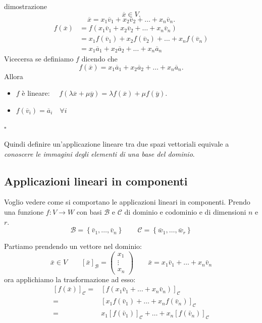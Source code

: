 \documentclass[x11names]{article}
\newcommand*{\QEDB}{\null\nobreak\hfill\ensuremath{\square}}%
\begin{document}
\begin{es}{dimostrazione}
\[
\overline{x} \in V
.\] 
\[
\overline{x} = x_1 \overline{v}_{1} + x_2\overline{v}_{2} + \dots + x_{n}\overline{v}_{n}
.\] 
\begin{align*}
	f\left(\overline{x}\right) &= f\left(x_1 \overline{v}_{1} + x_2\overline{v}_{2} + \dots + x_{n}\overline{v}_{n}\right) \\
				   &= x_1 f\left(\overline{v}_{1}\right) + x_2 f\left(\overline{v}_{2}\right) + \dots + x_{n}f\left(\overline{v}_{n}\right) \\
				   &= x_1 \overline{a}_{1} + x_2 \overline{a}_{2} + \dots + x_{n} \overline{a}_{n}
\end{align*}
Vicecersa se definiamo $f$ dicendo che 
\[
f\left(\overline{x}\right) = x_1 \overline{a}_{1} + x_2 \overline{a}_{2} + \dots + x_{n} \overline{a}_{n}
.\] 
Allora
\begin{itemize}
	\item $f$ è lineare: $\quad f\left(\lambda \overline{x} + \mu \overline{y}\right) = \lambda f\left(\overline{x}\right) + \mu f\left(\overline{y}\right)$.
	\item $f\left(\overline{v}_{i}\right) = \overline{a}_{i} \quad \forall i$
\end{itemize} \QEDB
\end{es}


Quindi definire un'applicazione lineare tra due spazi vettoriali equivale a \textit{conoscere le immagini degli elementi di una base del dominio}.

\subsection{Applicazioni lineari in componenti}
Voglio vedere come si comportano le applicazioni lineari in componenti. Prendo una funzione $f: V \to W$ con basi $\mathcal{B}$ e $\mathcal{C}$ di dominio e codominio e di dimensioni $n$ e $r$. 
\[
\mathcal{B} = \left\{\bar{v}_{1}, \dots, \bar{v}_{n}\right\} \qquad \mathcal{C} = \left\{\bar{w}_{1},\dots,\bar{w}_{r}\right\}
\]

\noindent
Partiamo prendendo un vettore nel dominio:
\[
\bar{x} \in V \qquad \left[\bar{x}\right]_{\mathcal{B}} = \left(\begin{array}{c}
	x_{1} \\
	\vdots \\
	x_{n}
\end{array}\right) \qquad \bar{x} = x_{1}\bar{v}_{1} + \dots + x_{n}\bar{v}_{n}
\]
ora applichiamo la trasformazione ad esso:
\begin{align*}
	\left[f(\bar{x})\right]_{\mathcal{C}} =& \left[f(x_{1}\bar{v}_{1} + \dots + x_{n}\bar{v}_{n})\right]_{\mathcal{C}}	\\
							=& \left[x_{1}f(\bar{v}_{1}) + \dots + x_{n}f(\bar{v}_{n})\right]_{\mathcal{C}} \\
							=& x_{1}\left[f(\bar{v}_{1})\right]_{\mathcal{C}} + \dots + x_{n}\left[f(\bar{v}_{n})\right]_{\mathcal{C}}
\end{align*}
\end{document}
